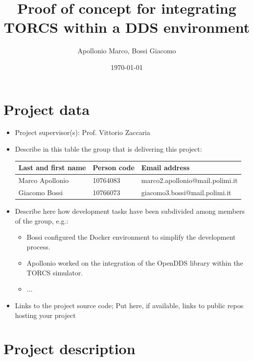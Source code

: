 \documentclass[10pt,a4]{article}
\author{Apollonio Marco, Bossi Giacomo}
\date{\today}
\title{Proof of concept for integrating TORCS within a DDS environment}
\begin{document}
\maketitle
\tableofcontents


\section{Project data}

\begin{itemize}
  \item
        Project supervisor(s): Prof. Vittorio Zaccaria

  \item
        Describe in this table the group that is delivering this project:

        \begin{center}
          \begin{tabular}{lll}
            Last and first name & Person code & Email address                   \\
            \hline
            Marco Apollonio     & 10764083    & marco2.apollonio@mail.polimi.it \\
            Giacomo Bossi       & 10766073    & giacomo3.bossi@mail.polimi.it
          \end{tabular}
        \end{center}

  \item
        Describe here how development tasks have been subdivided among members
        of the group, e.g.:

        \begin{itemize}
          \item Bossi configured the Docker environment to simplify the development process.
          \item Apollonio worked on the integration of the OpenDDS library within the TORCS simulator.
          \item ...
        \end{itemize}

  \item Links to the project source code; Put here, if available, links to public repos hosting your project

\end{itemize}


\section{Project description}
\end{document}
